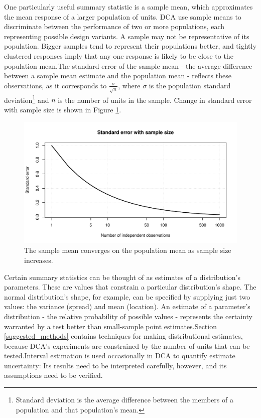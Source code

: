 \documentclass[11pt,a4paper,article]{memoir} %
\begin{document}
 \par
One particularly useful summary statistic is a sample mean, which approximates the mean response of a larger population of units. DCA use sample means to discriminate between the performance of two or more populations, each representing possible design variants. A sample may not be representative of its population. Bigger samples tend to represent their populations better, and tightly clustered responses imply that any one response is likely to be close to the population mean.The standard error of the sample mean - the average difference between a sample mean estimate and the population mean - reflects these observations, as it corresponds to $\frac{\sigma}{\sqrt{n}}$, where $\sigma$ is the population standard deviation\footnote{Standard deviation is the average difference between the members of a population and that population's mean.} and $n$ is the number of units in the sample. Change in standard error with sample size is shown in Figure \ref{fig:se_with_sample_size}.
\begin{figure}[h]
\includegraphics[width=\textwidth]{se_with_sample_size.pdf}
\caption{The sample mean converges on the population mean as sample size increases.}
\label{fig:se_with_sample_size}
\end{figure}

Certain summary statistics can be thought of as estimates of a distribution's parameters. These are values that constrain a particular distribution's shape. The normal distribution's shape, for example, can be specified by supplying just two values: the variance (spread) and mean (location). An estimate of a parameter's distribution - the relative probability of possible values - represents the certainty warranted by a test better than small-sample point estimates.Section \ref{suggested_methods} contains techniques for making distributional estimates, because DCA's experiments are constrained by the number of units that can be tested.Interval estimation is used occasionally in DCA to quantify estimate uncertainty: Its results need to be interpreted carefully, however, and its assumptions need to be verified.
\end{document}
